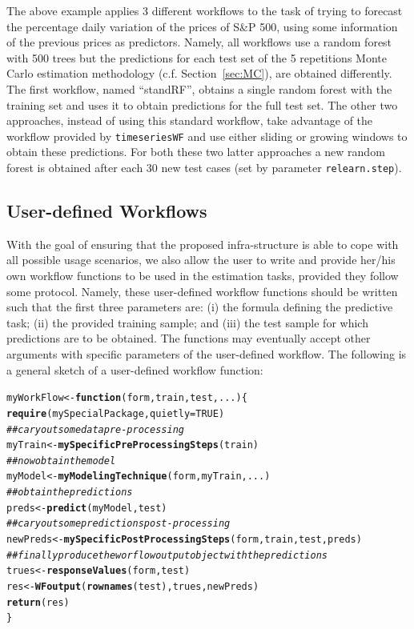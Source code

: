 \documentclass[10pt,a4paper]{article}\usepackage[]{graphicx}\usepackage[]{color}
\makeatletter
\newcommand{\hlnum}[1]{\textcolor[rgb]{0.686,0.059,0.569}{#1}}%
\newcommand{\hlcom}[1]{\textcolor[rgb]{0.678,0.584,0.686}{\textit{#1}}}%
\newcommand{\hlstd}[1]{\textcolor[rgb]{0.345,0.345,0.345}{#1}}%
\newcommand{\hlkwa}[1]{\textcolor[rgb]{0.161,0.373,0.58}{\textbf{#1}}}%
\newcommand{\hlkwb}[1]{\textcolor[rgb]{0.69,0.353,0.396}{#1}}%
\newcommand{\hlkwc}[1]{\textcolor[rgb]{0.333,0.667,0.333}{#1}}%
\newcommand{\hlkwd}[1]{\textcolor[rgb]{0.737,0.353,0.396}{\textbf{#1}}}%
\newenvironment{kframe}{%
 \def\at@end@of@kframe{}%
 \ifinner\ifhmode%
  \def\at@end@of@kframe{\end{minipage}}%
  \begin{minipage}{\columnwidth}%
 \fi\fi%
 \def\FrameCommand##1{\hskip\@totalleftmargin \hskip-\fboxsep
 \colorbox{shadecolor}{##1}\hskip-\fboxsep
     \hskip-\linewidth \hskip-\@totalleftmargin \hskip\columnwidth}%
 \MakeFramed {\advance\hsize-\width
   \@totalleftmargin\z@ \linewidth\hsize
   \@setminipage}}%
 {\par\unskip\endMakeFramed%
 \at@end@of@kframe}
\newenvironment{knitrout}{}{} %
\makeatother
\begin{document}
The above example applies 3 different workflows to the task of trying to forecast the percentage daily variation of the prices of S\&P 500, using some information of the previous prices as predictors. Namely, all workflows use a random forest with 500 trees but the predictions for each test set of the 5 repetitions Monte Carlo estimation methodology (c.f. Section~\ref{sec:MC}), are obtained differently. The first workflow, named ``standRF'', obtains a single random forest with the training set and uses it to obtain predictions for the full test set. The other two approaches, instead of using this standard workflow, take advantage of the workflow provided by \texttt{timeseriesWF} and use either  sliding  or growing windows to obtain these predictions. For both these two latter approaches a new random forest is obtained after each 30 new test cases (set by parameter \texttt{relearn.step}).


\subsection{User-defined Workflows}

With the goal of ensuring that the
proposed infra-structure is able to cope with all  possible usage
scenarios, we also allow the user to write and provide her/his own workflow functions to be used in the estimation tasks, provided they follow some protocol. Namely, these
user-defined workflow functions should be written such that the
first three parameters are: (i) the formula defining the predictive
task; (ii) the provided training sample; and (iii) the test sample
for which predictions are to be obtained. The functions may eventually
accept other arguments with specific parameters of the user-defined workflow. The
following is a general sketch of a user-defined workflow function:

\begin{knitrout}\footnotesize
{}\color{fgcolor}\begin{kframe}
\begin{alltt}
\hlstd{myWorkFlow} \hlkwb{<-} \hlkwa{function}\hlstd{(}\hlkwc{form}\hlstd{,}\hlkwc{train}\hlstd{,}\hlkwc{test}\hlstd{,}\hlkwc{...}\hlstd{) \{}
  \hlkwd{require}\hlstd{(mySpecialPackage,}\hlkwc{quietly}\hlstd{=}\hlnum{TRUE}\hlstd{)}
  \hlcom{## cary out some data pre-processing}
  \hlstd{myTrain} \hlkwb{<-} \hlkwd{mySpecificPreProcessingSteps}\hlstd{(train)}
  \hlcom{## now obtain the model}
  \hlstd{myModel} \hlkwb{<-} \hlkwd{myModelingTechnique}\hlstd{(form,myTrain,...)}
  \hlcom{## obtain the predictions}
  \hlstd{preds} \hlkwb{<-} \hlkwd{predict}\hlstd{(myModel,test)}
  \hlcom{## cary out some predictions post-processing}
  \hlstd{newPreds} \hlkwb{<-} \hlkwd{mySpecificPostProcessingSteps}\hlstd{(form,train,test,preds)}
  \hlcom{## finally produce the worflow output object with the predictions}
  \hlstd{trues} \hlkwb{<-} \hlkwd{responseValues}\hlstd{(form,test)}
  \hlstd{res} \hlkwb{<-} \hlkwd{WFoutput}\hlstd{(}\hlkwd{rownames}\hlstd{(test),trues,newPreds)}
  \hlkwd{return}\hlstd{(res)}
\hlstd{\}}
\end{alltt}
\end{kframe}
\end{knitrout}
\end{document}
